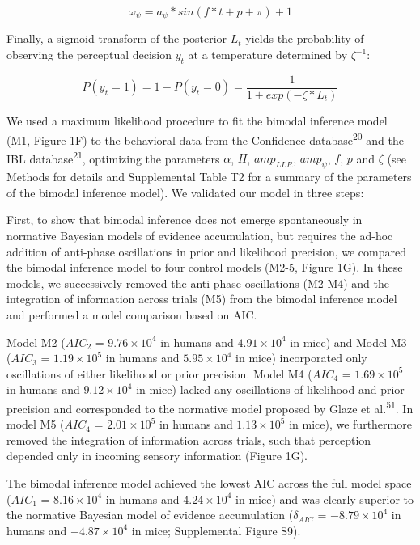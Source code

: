 \documentclass[
]{article}
\begin{document}
\begin{equation}
\omega_{\psi} = a_{\psi} * sin(f * t + p + \pi) + 1
\end{equation}

Finally, a sigmoid transform of the posterior \(L_t\) yields the
probability of observing the perceptual decision \(y_t\) at a
temperature determined by \(\zeta^{-1}\):

\begin{equation}
P(y_t = 1) = 1 - P(y_t = 0) = \frac{1}{1 + exp(-\zeta * L_t)}
\end{equation}

We used a maximum likelihood procedure to fit the bimodal inference
model (M1, Figure 1F) to the behavioral data from the Confidence
database\textsuperscript{20} and the IBL database\textsuperscript{21},
optimizing the parameters \(\alpha\), \(H\), \(amp_{LLR}\),
\(amp_{\psi}\), \(f\), \(p\) and \(\zeta\) (see Methods for details and
Supplemental Table T2 for a summary of the parameters of the bimodal
inference model). We validated our model in three steps:

First, to show that bimodal inference does not emerge spontaneously in
normative Bayesian models of evidence accumulation, but requires the
ad-hoc addition of anti-phase oscillations in prior and likelihood
precision, we compared the bimodal inference model to four control
models (M2-5, Figure 1G). In these models, we successively removed the
anti-phase oscillations (M2-M4) and the integration of information
across trials (M5) from the bimodal inference model and performed a
model comparison based on AIC.

Model M2 (\(AIC_2\) = \(\ensuremath{9.76\times 10^{4}}\) in humans and
\(\ensuremath{4.91\times 10^{4}}\) in mice) and Model M3 (\(AIC_3\) =
\(\ensuremath{1.19\times 10^{5}}\) in humans and
\(\ensuremath{5.95\times 10^{4}}\) in mice) incorporated only
oscillations of either likelihood or prior precision. Model M4
(\(AIC_4\) = \(\ensuremath{1.69\times 10^{5}}\) in humans and
\(\ensuremath{9.12\times 10^{4}}\) in mice) lacked any oscillations of
likelihood and prior precision and corresponded to the normative model
proposed by Glaze et al.\textsuperscript{51}. In model M5 (\(AIC_4\) =
\(\ensuremath{2.01\times 10^{5}}\) in humans and
\(\ensuremath{1.13\times 10^{5}}\) in mice), we furthermore removed the
integration of information across trials, such that perception depended
only in incoming sensory information (Figure 1G).

The bimodal inference model achieved the lowest AIC across the full
model space (\(AIC_1\) = \(\ensuremath{8.16\times 10^{4}}\) in humans
and \(\ensuremath{4.24\times 10^{4}}\) in mice) and was clearly superior
to the normative Bayesian model of evidence accumulation
(\(\delta_{AIC}\) = \(\ensuremath{-8.79\times 10^{4}}\) in humans and
\(\ensuremath{-4.87\times 10^{4}}\) in mice; Supplemental Figure S9).
\end{document}
